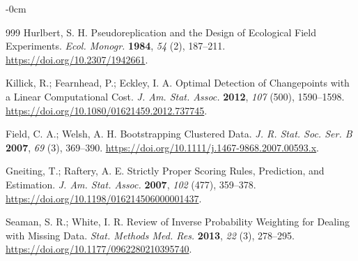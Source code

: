 \documentclass[aerospace,article,submit,moreauthors]{Definitions/mdpi}
\begin{document}
\begin{adjustwidth}{-\extralength}{0cm}
\begin{thebibliography}{999}
Hurlbert, S. H.
Pseudoreplication and the Design of Ecological Field Experiments.
{\em Ecol. Monogr.}
{\bf 1984}, {\em 54} (2), 187--211.
\url{https://doi.org/10.2307/1942661}.

Killick, R.; Fearnhead, P.; Eckley, I. A.
Optimal Detection of Changepoints with a Linear
Computational Cost.
{\em J. Am. Stat. Assoc.}
{\bf 2012}, {\em 107} (500), 1590--1598.
\url{https://doi.org/10.1080/01621459.2012.737745}.

Field, C. A.; Welsh, A. H.
Bootstrapping Clustered Data.
{\em J. R. Stat. Soc. Ser. B}
{\bf 2007}, {\em 69} (3), 369--390.
\url{https://doi.org/10.1111/j.1467-9868.2007.00593.x}.

Gneiting, T.; Raftery, A. E.
Strictly Proper Scoring Rules, Prediction,
and Estimation.
{\em J. Am. Stat. Assoc.}
{\bf 2007}, {\em 102} (477), 359--378.
\url{https://doi.org/10.1198/016214506000001437}.

Seaman, S. R.; White, I. R.
Review of Inverse Probability Weighting
for Dealing with Missing Data.
{\em Stat. Methods Med. Res.}
{\bf 2013}, {\em 22} (3), 278--295.
\url{https://doi.org/10.1177/0962280210395740}.

\end{thebibliography}



\end{adjustwidth}
\end{document}
